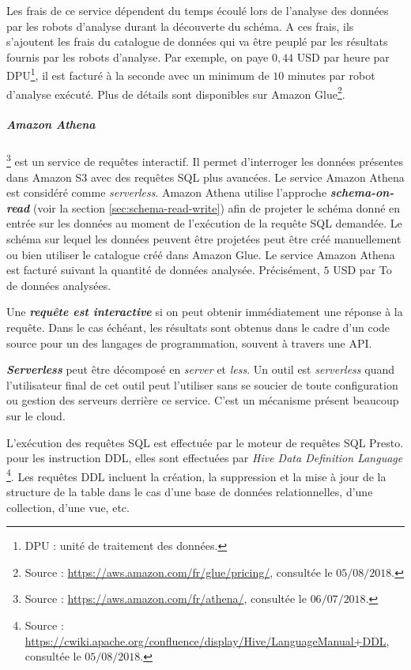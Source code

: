 Les frais de ce service dépendent du temps écoulé lors de l'analyse des données par les robots d'analyse durant la découverte du schéma. A ces frais, ils s'ajoutent les frais du catalogue de données qui va être peuplé par les résultats fournis par les robots d'analyse. Par exemple, on paye $ 0,44 $ USD par heure par DPU\footnote{DPU : unité de traitement des données.}, il est facturé à la seconde avec un minimum de $ 10 $ minutes par robot d'analyse exécuté. Plus de détails sont disponibles sur Amazon Glue\footnote{Source : \url{https://aws.amazon.com/fr/glue/pricing/}, consultée le $05/08/2018$.}.

\subparagraph{Amazon Athena}\label{aws:athena}\footnote{Source : \url{https://aws.amazon.com/fr/athena/}, consultée le $06/07/2018$.} est un service de requêtes  interactif. Il permet d'interroger les données présentes dans Amazon S3 avec des requêtes SQL plus avancées. Le service Amazon Athena est considéré comme \textit{serverless}. Amazon Athena utilise l'approche \textbf{\textit{schema-on-read}} (voir la section \ref{sec:schema-read-write}) afin de projeter le schéma donné en entrée sur les données au moment de l'exécution de la requête SQL demandée. Le schéma sur lequel les données peuvent être projetées peut être créé manuellement ou bien utiliser le catalogue créé dans Amazon Glue.
 Le service Amazon Athena est facturé suivant la quantité de données analysée. Précisément, $ 5 $ USD par To de données analysées.


\begin{tcolorbox}
	Une \textbf{\textit{requête est	interactive}} si on peut  obtenir immédiatement une réponse à la requête.  Dans le cas échéant, les résultats sont obtenus  dans le cadre d'un code source pour un des langages de programmation, souvent à travers une API.
\end{tcolorbox}

\begin{tcolorbox}
	\textbf{\textit{Serverless}} peut être décomposé en \textit{server} et \textit{less}. Un outil est \textit{serverless} quand l'utilisateur final de cet outil peut l'utiliser sans se soucier de toute configuration ou gestion des serveurs derrière ce service. C'est un mécanisme présent beaucoup sur le cloud.
\end{tcolorbox}

L'exécution des requêtes SQL est effectuée par le moteur de requêtes SQL Presto. pour les instruction DDL, elles sont effectuées par  \textit{Hive Data Definition Language} \footnote{Source : \url{https://cwiki.apache.org/confluence/display/Hive/LanguageManual+DDL}, consultée le $05/08/2018$.}. Les requêtes DDL incluent la création, la suppression et la mise à jour de la structure de la table dans le cas d'une base de données relationnelles, d'une collection, d'une vue, etc. 



